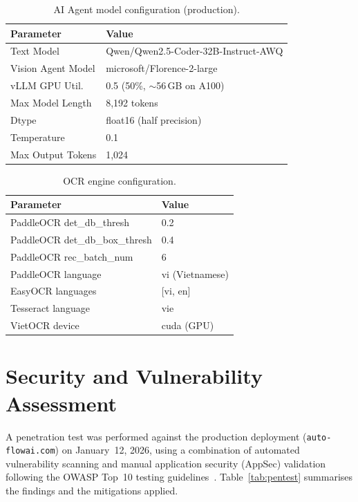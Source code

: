 \documentclass[11pt,a4paper]{report}
\begin{document}
\begin{table}[H]
\centering
\caption{AI Agent model configuration (production).}
\label{tab:config-ai}
\small
\begin{tabular}{ll}
\toprule
\textbf{Parameter} & \textbf{Value} \\
\midrule
Text Model          & Qwen/Qwen2.5-Coder-32B-Instruct-AWQ \\
Vision Agent Model  & microsoft/Florence-2-large \\
vLLM GPU Util.      & 0.5 (50\%, $\sim$56\,GB on A100) \\
Max Model Length     & 8,192 tokens \\
Dtype               & float16 (half precision) \\
Temperature          & 0.1 \\
Max Output Tokens    & 1,024 \\
\bottomrule
\end{tabular}
\end{table}

\begin{table}[H]
\centering
\caption{OCR engine configuration.}
\label{tab:config-ocr}
\small
\begin{tabular}{ll}
\toprule
\textbf{Parameter} & \textbf{Value} \\
\midrule
PaddleOCR det\_db\_thresh     & 0.2 \\
PaddleOCR det\_db\_box\_thresh & 0.4 \\
PaddleOCR rec\_batch\_num     & 6 \\
PaddleOCR language            & vi (Vietnamese) \\
EasyOCR languages             & [vi, en] \\
Tesseract language             & vie \\
VietOCR device                 & cuda (GPU) \\
\bottomrule
\end{tabular}
\end{table}

\chapter{Security and Vulnerability Assessment}
\label{app:pentest}

A penetration test was performed against the production deployment (\texttt{auto-flowai.com}) on January~12, 2026, using a combination of automated vulnerability scanning and manual application security (AppSec) validation following the OWASP Top~10 testing guidelines~\cite{owasp2021}. Table~\ref{tab:pentest} summarises the findings and the mitigations applied.
\end{document}
